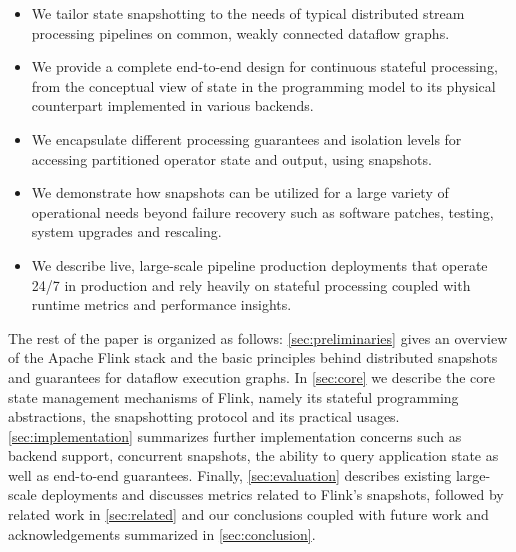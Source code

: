 \begin{itemize}
	\item We tailor state snapshotting to the needs of typical distributed stream processing pipelines on common, weakly connected dataflow graphs.
	\item We provide a complete end-to-end design for continuous stateful processing, from the conceptual view of state in the programming model to its physical counterpart implemented in various backends.
	\item We encapsulate different processing guarantees and isolation levels for accessing partitioned operator state and output, using snapshots.
	\item We demonstrate how snapshots can be utilized for a large variety of operational needs beyond failure recovery such as software patches, testing, system upgrades and rescaling.
	\item We describe live, large-scale pipeline production deployments that operate 24/7 in production and rely heavily on stateful processing coupled with runtime metrics and performance insights.
\end{itemize}

The rest of the paper is organized as follows: \autoref{sec:preliminaries} gives an overview of the Apache Flink stack and the basic principles behind distributed snapshots and guarantees for dataflow execution graphs. In \autoref{sec:core} we describe the core state management mechanisms of Flink, namely its stateful programming abstractions, the snapshotting protocol and its practical usages. \autoref{sec:implementation} summarizes further implementation concerns such as backend support, concurrent snapshots, the ability to query application state as well as end-to-end guarantees. Finally, \autoref{sec:evaluation} describes existing large-scale deployments and discusses metrics related to Flink's snapshots, followed by related work in \autoref{sec:related} and our conclusions coupled with future work and acknowledgements summarized in \autoref{sec:conclusion}. 
